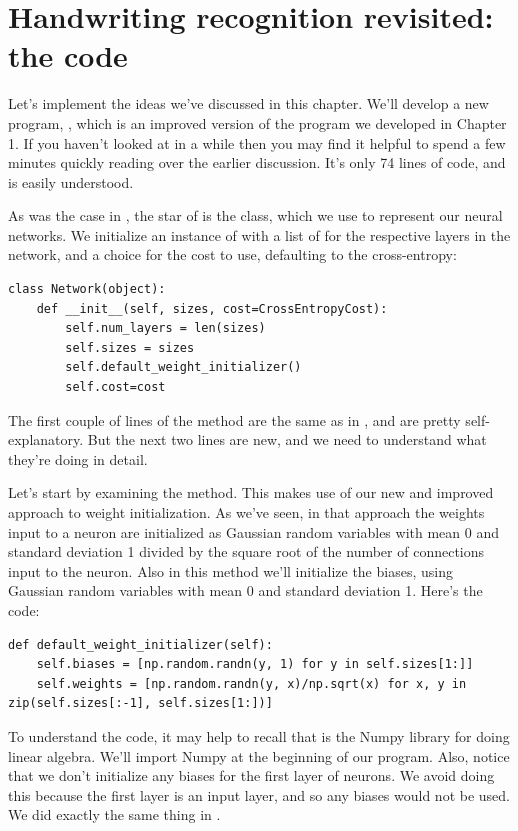 \documentclass[a4paper,twoside,10pt]{book}
\begin{document}
\section{Handwriting recognition revisited: the code}
Let's implement the ideas we've discussed in this chapter. We'll develop a new program, , which is an improved version of the program  we developed in Chapter 1. If you haven't looked at  in a while then you may find it helpful to spend a few minutes quickly reading over the earlier discussion. It's only 74 lines of code, and is easily understood.

As was the case in , the star of  is the  class, which we use to represent our neural networks. We initialize an instance of  with a list of  for the respective layers in the network, and a choice for the cost to use, defaulting to the cross-entropy:
\begin{lstlisting}
class Network(object):
	def __init__(self, sizes, cost=CrossEntropyCost):
		self.num_layers = len(sizes)
		self.sizes = sizes
		self.default_weight_initializer()
		self.cost=cost
\end{lstlisting}
The first couple of lines of the  method are the same as in , and are pretty self-explanatory. But the next two lines are new, and we need to understand what they're doing in detail.

Let's start by examining the  method. This makes use of our new and improved approach to weight initialization. As we've seen, in that approach the weights input to a neuron are initialized as Gaussian random variables with mean 0 and standard deviation 1 divided by the square root of the number of connections input to the neuron. Also in this method we'll initialize the biases, using Gaussian random variables with mean 0 and standard deviation 1. Here's the code:
\begin{lstlisting}
def default_weight_initializer(self):
	self.biases = [np.random.randn(y, 1) for y in self.sizes[1:]]
	self.weights = [np.random.randn(y, x)/np.sqrt(x) for x, y in zip(self.sizes[:-1], self.sizes[1:])]
\end{lstlisting}
To understand the code, it may help to recall that  is the Numpy library for doing linear algebra. We'll import Numpy at the beginning of our program. Also, notice that we don't initialize any biases for the first layer of neurons. We avoid doing this because the first layer is an input layer, and so any biases would not be used. We did exactly the same thing in .
\end{document}
